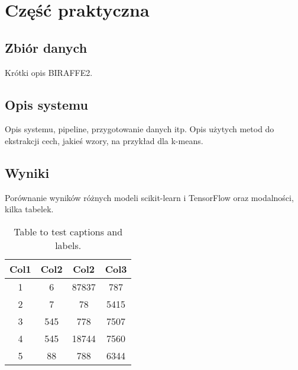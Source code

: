 \chapter{Część praktyczna}\label{ch:czesc-praktyczna}

\section{Zbiór danych}\label{sec:zbior-danych}
Krótki opis BIRAFFE2.


\section{Opis systemu}\label{sec:opis-systemu}
Opis systemu, pipeline, przygotowanie danych itp.
Opis użytych metod do ekstrakcji cech, jakieś wzory, na przykład dla k-means.


\section{Wyniki}\label{sec:wyniki}
Porównanie wyników różnych modeli scikit-learn i TensorFlow oraz modalności, kilka tabelek.

\begin{table}[h!]
    \centering
    \begin{tabular}{||c c c c||}
        \hline
        Col1 & Col2 & Col2 & Col3 \\ [0.5ex]
        \hline\hline
        1 & 6 & 87837 & 787 \\
        2 & 7 & 78 & 5415 \\
        3 & 545 & 778 & 7507 \\
        4 & 545 & 18744 & 7560 \\
        5 & 88 & 788 & 6344 \\ [1ex]
        \hline
    \end{tabular}
    \caption{Table to test captions and labels.}
    \label{tab:table1}
\end{table}
